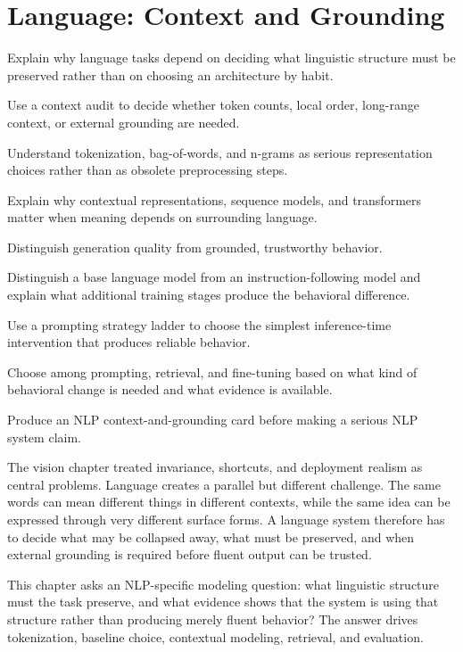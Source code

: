 \chapter{Language: Context and Grounding}

\begin{learninggoals}
\item Explain why language tasks depend on deciding what linguistic structure must be preserved rather than on choosing an architecture by habit.
\item Use a context audit to decide whether token counts, local order, long-range context, or external grounding are needed.
\item Understand tokenization, bag-of-words, and n-grams as serious representation choices rather than as obsolete preprocessing steps.
\item Explain why contextual representations, sequence models, and transformers matter when meaning depends on surrounding language.
\item Distinguish generation quality from grounded, trustworthy behavior.
\item Distinguish a base language model from an instruction-following model and explain what additional training stages produce the behavioral difference.
\item Use a prompting strategy ladder to choose the simplest inference-time intervention that produces reliable behavior.
\item Choose among prompting, retrieval, and fine-tuning based on what kind of behavioral change is needed and what evidence is available.
\item Produce an NLP context-and-grounding card before making a serious NLP system claim.
\end{learninggoals}

The vision chapter treated invariance, shortcuts, and deployment realism as central problems. Language creates a parallel but different challenge. The same words can mean different things in different contexts, while the same idea can be expressed through very different surface forms. A language system therefore has to decide what may be collapsed away, what must be preserved, and when external grounding is required before fluent output can be trusted.

\begin{problemsolvinglens}
This chapter asks an NLP-specific modeling question: what linguistic structure must the task preserve, and what evidence shows that the system is using that structure rather than producing merely fluent behavior? The answer drives tokenization, baseline choice, contextual modeling, retrieval, and evaluation.
\end{problemsolvinglens}

